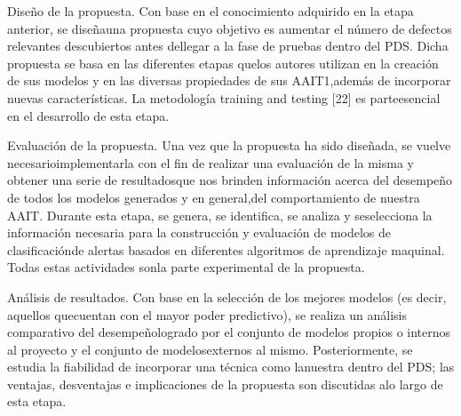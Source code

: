 Diseño de la propuesta. Con base en el conocimiento adquirido en la etapa anterior, se diseñauna propuesta cuyo objetivo es aumentar el número de defectos relevantes descubiertos antes dellegar a la fase de pruebas dentro del PDS. Dicha propuesta se basa en las diferentes etapas quelos autores utilizan en la creación de sus modelos y en las diversas propiedades de sus AAIT1,además de incorporar nuevas características. La metodología training and testing [22] es parteesencial en el desarrollo de esta etapa.

Evaluación de la propuesta. Una vez que la propuesta ha sido diseñada, se vuelve necesarioimplementarla con el fin de realizar una evaluación de la misma y obtener una serie de resultadosque nos brinden información acerca del desempeño de todos los modelos generados y en general,del comportamiento de nuestra AAIT. Durante esta etapa, se genera, se identifica, se analiza y seselecciona la información necesaria para la construcción y evaluación de modelos de clasificaciónde alertas basados en diferentes algoritmos de aprendizaje maquinal. Todas estas actividades sonla parte experimental de la propuesta.

Análisis de resultados. Con base en la selección de los mejores modelos (es decir, aquellos quecuentan con el mayor poder predictivo), se realiza un análisis comparativo del desempeñologrado por el conjunto de modelos propios o internos al proyecto y el conjunto de modelosexternos al mismo. Posteriormente, se estudia la fiabilidad de incorporar una técnica como lanuestra dentro del PDS; las ventajas, desventajas e implicaciones de la propuesta son discutidas alo largo de esta etapa.